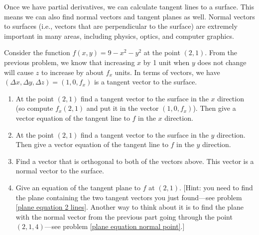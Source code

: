 Once we have partial derivatives, we can calculate tangent lines to a surface. This means we can also find normal vectors and tangent planes as well.  Normal vectors to surfaces (i.e., vectors that are perpendicular to the surface) are extremely important in many areas, including physics, optics, and computer graphics.
\begin{problem} \label{cake plane introduction}%
 Consider the function $f(x,y)=9-x^2-y^2$ at the point $(2,1)$. From the previous problem, we know that increasing $x$ by 1 unit when $y$ does not change will cause $z$ to increase by about $f_x$ units. In terms of vectors, we have $(\Delta x, \Delta y, \Delta z) = (1,0,f_x)$ is a tangent vector to the surface. 
\begin{enumerate}
 \item At the point $(2,1)$ find a tangent vector to the surface in the $x$ direction (so compute $f_x(2,1)$ and put it in the vector $(1,0,f_x)$). Then give a vector equation of the tangent line to $f$ in the $x$ direction.
 \item At the point $(2,1)$ find a tangent vector to the surface in the $y$ direction. 
Then give a vector equation of the tangent line to $f$ in the $y$ direction.
 \item{}%
 Find a vector that is orthogonal to both of the vectors above.  This vector is a normal vector to the surface.
 \item Give an equation of the tangent plane to $f$ at $(2,1)$. [Hint: you need to find the plane containing the two tangent vectors you just found---see problem \ref{plane equation 2 lines}.  Another way to think about it is to find the plane with the normal vector from the previous part going through the point $(2,1,4)$---see problem \ref{plane equation normal point}.]
\end{enumerate}
\end{problem}


